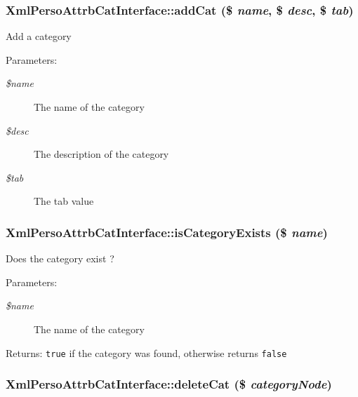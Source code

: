 \subsubsection{\setlength{\rightskip}{0pt plus 5cm}XmlPersoAttrbCatInterface::addCat (\$ {\em name}, \$ {\em desc}, \$ {\em tab})}\label{classXmlPersoAttrbCatInterface_d04f102004ab751b12319102abcaafb2}


Add a category

\begin{Desc}
\item[Parameters:]
\begin{description}
\item[{\em \$name}]The name of the category \item[{\em \$desc}]The description of the category \item[{\em \$tab}]The tab value \end{description}
\end{Desc}
\subsubsection{\setlength{\rightskip}{0pt plus 5cm}XmlPersoAttrbCatInterface::isCategoryExists (\$ {\em name})}\label{classXmlPersoAttrbCatInterface_b52ff1aa1bd3e9452a59965e205859b2}


Does the category exist ?

\begin{Desc}
\item[Parameters:]
\begin{description}
\item[{\em \$name}]The name of the category\end{description}
\end{Desc}
\begin{Desc}
\item[Returns:]{\tt true} if the category was found, otherwise returns {\tt false} \end{Desc}
\subsubsection{\setlength{\rightskip}{0pt plus 5cm}XmlPersoAttrbCatInterface::deleteCat (\$ {\em categoryNode})}\label{classXmlPersoAttrbCatInterface_a2652885549922c862ad75f0fd686918}


